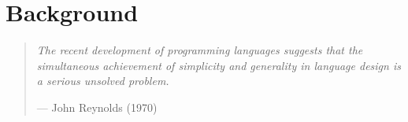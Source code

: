 \documentclass[12pt]{cmuthesis}
\begin{document}
\chapter{Background}\label{chap:background}
\vspace{-6px}
\begin{quote}\textit{The recent development of programming languages suggests that the simul\-taneous achievement of simplicity 
and generality in language design is a serious unsolved 
problem.}\begin{flushright}--- John Reynolds (1970) \cite{Reynolds70}\end{flushright}
\end{quote}
\vspace{-6px}
\end{document}

